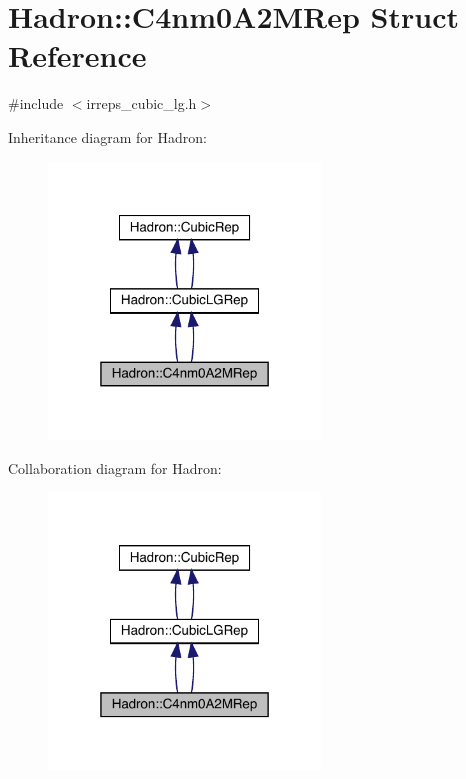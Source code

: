 \hypertarget{structHadron_1_1C4nm0A2MRep}{}\section{Hadron\+:\+:C4nm0\+A2\+M\+Rep Struct Reference}
\label{structHadron_1_1C4nm0A2MRep}


{\ttfamily \#include $<$irreps\+\_\+cubic\+\_\+lg.\+h$>$}



Inheritance diagram for Hadron\+:\nopagebreak
\begin{figure}[H]
\begin{center}
\leavevmode
\includegraphics[width=205pt]{dd/d8f/structHadron_1_1C4nm0A2MRep__inherit__graph}
\end{center}
\end{figure}


Collaboration diagram for Hadron\+:\nopagebreak
\begin{figure}[H]
\begin{center}
\leavevmode
\includegraphics[width=205pt]{d5/d6a/structHadron_1_1C4nm0A2MRep__coll__graph}
\end{center}
\end{figure}
